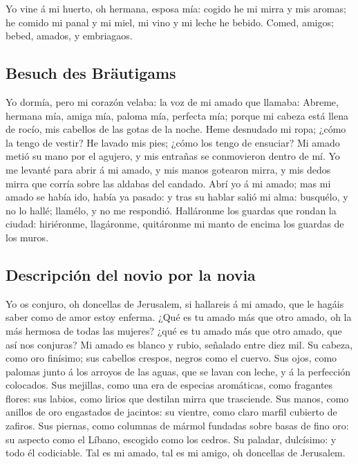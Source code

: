  Yo vine á mi huerto, oh hermana, esposa mía: cogido he mi
mirra y mis aromas; he comido mi panal y mi miel, mi vino y mi leche he
bebido. Comed, amigos; bebed, amados, y embriagaos.

\hypertarget{besuch-des-bruxe4utigams}{%
\subsection{Besuch des Bräutigams}\label{besuch-des-bruxe4utigams}}

 Yo dormía, pero mi corazón velaba: la voz de mi amado que
llamaba: Abreme, hermana mía, amiga mía, paloma mía, perfecta mía;
porque mi cabeza está llena de rocío, mis cabellos de las gotas de la
noche.  Heme desnudado mi ropa; ¿cómo la tengo de vestir?
He lavado mis pies; ¿cómo los tengo de ensuciar?  Mi amado
metió su mano por el agujero, y mis entrañas se conmovieron dentro de
mí.  Yo me levanté para abrir á mi amado, y mis manos
gotearon mirra, y mis dedos mirra que corría sobre las aldabas del
candado.  Abrí yo á mi amado; mas mi amado se había ido,
había ya pasado: y tras su hablar salió mi alma: busquélo, y no lo
hallé; llamélo, y no me respondió.  Halláronme los guardas
que rondan la ciudad: hiriéronme, llagáronme, quitáronme mi manto de
encima los guardas de los muros.

\hypertarget{descripciuxf3n-del-novio-por-la-novia}{%
\subsection{Descripción del novio por la
novia}\label{descripciuxf3n-del-novio-por-la-novia}}

 Yo os conjuro, oh doncellas de Jerusalem, si hallareis á
mi amado, que le hagáis saber como de amor estoy enferma. 
¿Qué es tu amado más que otro amado, oh la más hermosa de todas las
mujeres? ¿qué es tu amado más que otro amado, que así nos conjuras?
 Mi amado es blanco y rubio, señalado entre diez mil.
 Su cabeza, como oro finísimo; sus cabellos crespos,
negros como el cuervo.  Sus ojos, como palomas junto á
los arroyos de las aguas, que se lavan con leche, y á la perfección
colocados.  Sus mejillas, como una era de especias
aromáticas, como fragantes flores: sus labios, como lirios que destilan
mirra que trasciende.  Sus manos, como anillos de oro
engastados de jacintos: su vientre, como claro marfil cubierto de
zafiros.  Sus piernas, como columnas de mármol fundadas
sobre basas de fino oro: su aspecto como el Líbano, escogido como los
cedros.  Su paladar, dulcísimo: y todo él codiciable. Tal
es mi amado, tal es mi amigo, oh doncellas de Jerusalem.

